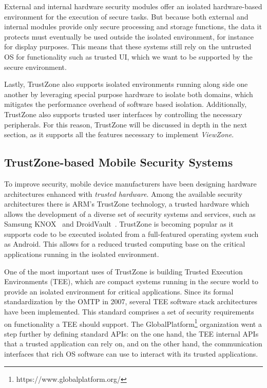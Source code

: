 External and internal hardware security modules offer an isolated hardware-based environment for the execution of secure tasks. But because both external and internal modules provide only secure processing and storage functions, the data it protects must eventually be used outside the isolated environment, for instance for display purposes. This means that these systems still rely on the untrusted OS for functionality such as trusted UI, which we want to be supported by the secure environment.

Lastly, TrustZone also supports isolated environments running along side one another by leveraging special purpose hardware to isolate both domains, which mitigates the performance overhead of software based isolation. Additionally, TrustZone also supports trusted user interfaces by controlling the necessary peripherals. For this reason, TrustZone will be discussed in depth in the next section, as it supports all the features necessary to implement \emph{ViewZone}.

\subsection{TrustZone-based Mobile Security Systems}
\label{sec:trustzone}

To improve security, mobile device manufacturers have been designing hardware architectures enhanced with \emph{trusted hardware}. Among the available security architectures there is ARM's TrustZone technology, a trusted hardware which allows the development of a diverse set of security systems and services, such as Samsung KNOX~\cite{knox_whitepaper} and DroidVault~\cite{li2014droidvault}. TrustZone is becoming popular as it supports code to be executed isolated from a full-featured operating system such as Android. This allows for a reduced trusted computing base on the critical applications running in the isolated environment.

One of the most important uses of TrustZone is building Trusted Execution Environments (TEE), which are compact systems running in the secure world to provide an isolated environment for critical applications. Since its formal standardization by the OMTP in 2007, several \ac{TEE} software stack architectures have been implemented. This standard comprises a set of security requirements on functionality a TEE should support. The GlobalPlatform\footnote{https://www.globalplatform.org/} organization went a step further by defining standard APIs: on the one hand, the TEE internal APIs that a trusted application can rely on, and on the other hand, the communication interfaces that rich OS software can use to interact with its trusted applications.

